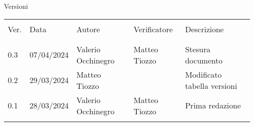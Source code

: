 \documentclass[italian,12pt]{article} %
\begin{document}


\newpage



\captionsetup[table]{list=no}

\begin{table}[!h]
	\begin{center}
		Versioni\\
		\vspace{0.5cm}
		\begin{tabular}{ l l l l l }
			\hline                                                                          		\\[-2ex]
			Ver. 	& Data			& Autore			 & Verificatore		& Descrizione\\
			\\[-2ex] \hline \\[-1.5ex]

			0.3 	 & 07/04/2024 	& Valerio Occhinegro & Matteo Tiozzo	& Stesura documento	\\
			0.2	     & 29/03/2024 	& Matteo Tiozzo 	 & 					& Modificato tabella versioni	\\
			0.1 	 & 28/03/2024 	& Valerio Occhinegro & Matteo Tiozzo 	& Prima redazione				\\
			\\[-1.5ex] \hline
		\end{tabular}
	\end{center}
\end{table}
\captionsetup[table]{list=yes}

\newpage
\tableofcontents
\listoftables
\listoffigures
\newpage










\end{document}
